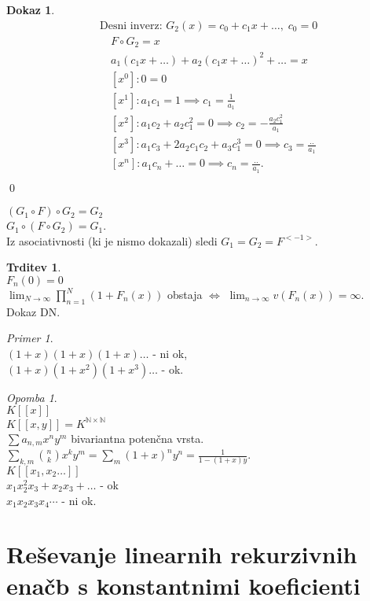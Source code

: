 \documentclass[a4paper, 12pt]{book}
\theoremstyle{definition}
\newtheorem{claim}[counter]{Trditev}
\newtheorem{pro}[counter]{Dokaz}
\theoremstyle{remark}
\newtheorem*{ex}{Primer}
\newtheorem*{rem}{Opomba}
\newcommand{\N}{\mathbb{N}}
\begin{document}
\begin{pro}
\begin{align*}
    &\text{Desni inverz: } G_2(x) = c_0 + c_1 x + \dots, \; c_0 = 0 \\
    &\quad F \circ G_2 = x \\
    &\quad a_1 (c_1 x + \dots) + a_2 (c_1 x + \dots)^2 + \dots = x \\
    &\quad [x^0]: 0 = 0 \\
    &\quad [x^1]: a_1 c_1 = 1 \implies c_1 = \frac{1}{a_1} \\
    &\quad [x^2]: a_1 c_2 + a_2 c_1^2 = 0 \implies c_2 = -\frac{a_2 c_1^2}{a_1} \\
    &\quad [x^3]: a_1 c_3 + 2 a_2 c_1 c_2 + a_3 c_1^3 = 0 \implies c_3 = \frac{..}{a_1} \\
    &\quad [x^n]: a_1 c_n + \dots = 0 \implies c_n = \frac{..}{a_1}. \\
  \end{align*}
  \qed
\end{pro}
$(G_1 \circ F) \circ G_2 = G_2$ \\
$G_1 \circ (F \circ G_2) = G_1$. \\
Iz asociativnosti (ki je nismo dokazali) sledi $G_1 = G_2 = F^{<-1>}$.
\begin{claim} \text{} \\
  $F_n(0) = 0$ \\
  $\lim_{N \to \infty} \prod_{n=1}^{N} (1 + F_n(x))$ obstaja $\iff$ $\lim_{n \to \infty} v(F_n(x)) = \infty$. \\
  Dokaz DN.
\end{claim}
\begin{ex} \text{} \\
  $(1+x) (1+x) (1+x) \dots$ - ni ok, \\
  $(1+x) (1+x^2) (1+x^3) \dots$ - ok.
\end{ex}
\begin{rem} \text{} \\
  $K[[x]]$ \\
  $K[[x,y]] = K^{\N \times \N}$ \\
  $\sum a_{n,m} x^n y^m$ bivariantna potenčna vrsta. \\
  $\sum_{k,m} \binom{n}{k} x^k y^m = \sum_m (1+x)^n y^n = \frac{1}{1-(1+x)y}$. \\
  $K[[x_1, x_2 \dots]]$ \\
  $x_1 x_2^2 x_3 + x_2 x_3 + \dots$ - ok \\
  $x_1 x_2 x_3 x_4 \cdots$ - ni ok.
\end{rem}


\section{Reševanje linearnih rekurzivnih enačb s konstantnimi koeficienti}
\end{document}
